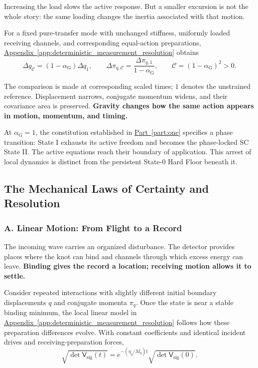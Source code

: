 Increasing the load slows the active response. But a smaller excursion is not the whole story: the same loading changes the inertia associated with that motion.

For a fixed pure-transfer mode with unchanged stiffness, uniformly loaded receiving channels, and corresponding equal-action preparations, \hyperref[app:deterministic_measurement_resolution]{Appendix~\ref*{app:deterministic_measurement_resolution}} obtains
\begin{equation}
    \Delta q_{\mathcal C}
    =
    (1-\alpha_{\mathrm G})\Delta q_1,
    \qquad
    \Delta\pi_{q,\mathcal C}
    =
    \frac{\Delta\pi_{q,1}}{1-\alpha_{\mathrm G}},
    \qquad
    \mathcal C=(1-\alpha_{\mathrm G})^2>0.
\end{equation}

The comparison is made at corresponding scaled times; $1$ denotes the unstrained reference. Displacement narrows, conjugate momentum widens, and their covariance area is preserved. \textbf{Gravity changes how the same action appears in motion, momentum, and timing.}

At $\alpha_{\mathrm G}=1$, the constitution established in \hyperref[part:one]{Part~\ref*{part:one}} specifies a phase transition: State I exhausts its active freedom and becomes the phase-locked SC State II. The active equations reach their boundary of application. This arrest of local dynamics is distinct from the persistent State-0 Hard Floor beneath it.


\subsection{The Mechanical Laws of Certainty and Resolution}

\subsubsection*{A. Linear Motion: From Flight to a Record}

The incoming wave carries an organized disturbance. The detector provides places where the knot can bind and channels through which excess energy can leave. \textbf{Binding gives the record a location; receiving motion allows it to settle.}

Consider repeated interactions with slightly different initial boundary displacements $q$ and conjugate momenta $\pi_q$. Once the state is near a stable binding minimum, the local linear model in \hyperref[app:deterministic_measurement_resolution]{Appendix~\ref*{app:deterministic_measurement_resolution}} follows how these preparation differences evolve. With constant coefficients and identical incident drives and receiving-preparation forces,
\begin{equation}
    \sqrt{\det\mathsf V_{\mathrm{sig}}(t)}
    =
    e^{-(\eta_q/M_q)t}
    \sqrt{\det\mathsf V_{\mathrm{sig}}(0)}.
\end{equation}

